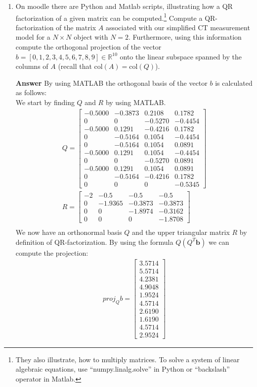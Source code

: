 \documentclass[10pt,a4paper]{article}
\theoremstyle{plain}
\theoremstyle{definition}
\begin{document}
\begin{enumerate}
  \item On moodle there are Python and Matlab scripts, illustrating how a QR factorization of a given matrix can be computed.\footnote{They also illustrate, how to multiply matrices.  To solve a system of linear algebraic equations, use ``numpy.linalg.solve'' in Python or ``backslash'' operator in Matlab.}
  Compute a QR-factorization of the matrix \(A\) associated with our simplified CT measurement model for a \(N\times N\) object with \(N=2\).
  Furthermore, using this information  compute the orthogonal projection of the vector \(b = [0,1,2,3,4,5,6,7,8,9]\in \mathbb{R}^{10}\) onto the linear subspace spanned by the columns of \(A\) (recall that  \(\text{col}(A) = \text{col}(Q)\)).
  \item[\textbf{Answer}] By using MATLAB the orthogonal basis of the vector $b$ is calculated as follows: \\
  We start by finding $Q$ and $R$ by using MATLAB.
  \begin{align*}
	Q=\begin{bmatrix}
    	-0.5000 & -0.3873 & 0.2108 & 0.1782 \\
		0 & 0 & -0.5270 & -0.4454 \\
		-0.5000 & 0.1291 & -0.4216 & 0.1782 \\
		0 & -0.5164 & 0.1054 & -0.4454 \\
		0 & -0.5164 & 0.1054 & 0.0891 \\
		-0.5000 & 0.1291 & 0.1054 & -0.4454 \\
		0 & 0 & -0.5270 & 0.0891 \\
		-0.5000 & 0.1291 & 0.1054 & 0.0891 \\
		0 & -0.5164 & -0.4216 & 0.1782 \\
		0 & 0 & 0 & -0.5345
    \end{bmatrix} \\
    R=\begin{bmatrix}
    	-2 & -0.5 & -0.5 & -0.5 \\
		0 & -1.9365 & -0.3873 & -0.3873 \\
		0 & 0 & -1.8974 & -0.3162 \\
		0 & 0 & 0 & -1.8708
    \end{bmatrix} \\
   \end{align*}
   We now have an orthonormal basis $Q$ and the upper triangular matrix $R$ by definition of QR-factorization. By using the formula $Q(Q^T\mathbf{b})$ we can compute the projection:
   \begin{align*}
	proj_Qb=\begin{bmatrix}
      3.5714 \\
      5.5714 \\
      4.2381 \\
      4.9048 \\
      1.9524 \\
      4.5714 \\
      2.6190 \\
      1.6190 \\
      4.5714 \\
      2.9524
    \end{bmatrix}
  \end{align*}


\end{enumerate}
\end{document}
